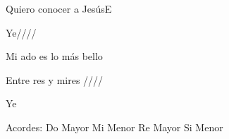\documentclass[12pt, spanish]{book}
\begin{document}
\begin{song}{Quiero conocer a Jesús}{E}
        \begin{SBExtraKeys}{
            \clearpage

            \begin{SBOpGroup}
                Ye////

                Mi ado es lo más bello

                Entre res y mires ////

                Ye
            \end{SBOpGroup}

            \ifChordBk
            \begin{SBOpGroup}
                Acordes:
                \upchord{\C}\qquad Do Mayor \hfill
                \upchord{\Em}\qquad Mi Menor \hfill\null\break
                \upchord{\D}\qquad Re Mayor \hfill
                \upchord{\Bm}\qquad Si Menor \hfill\null\break
            \end{SBOpGroup}
            \fi
        }\end{SBExtraKeys}
    \end{song}
\end{document}
